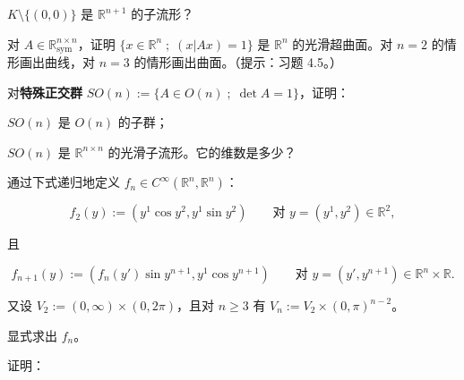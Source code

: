 \begin{exercises}
\begin{items}
\item

$ K \setminus \{(0, 0)\} $
是 $ \mathbb{R}^{n+1} $ 的子流形？

\end{items}

\item

对 $ A \in \mathbb{R}^{n\times n}_{\mathrm{sym}} $，证明 $ \{ x \in \mathbb{R}^{n} \;;\; (x|Ax) = 1 \} $ 是 $ \mathbb{R}^{n} $ 的光滑超曲面。对 $ n = 2 $ 的情形画出曲线，对 $ n = 3 $ 的情形画出曲面。（提示：习题 4.5。）

\item

对\textbf{特殊正交群} $ SO(n) := \{ A \in O(n) \;;\; \det A = 1 \} $，证明：

\begin{items}
\item

$ SO(n) $ 是 $ O(n) $ 的子群；

\item

$ SO(n) $ 是 $ \mathbb{R}^{n\times n} $ 的光滑子流形。它的维数是多少？

\end{items}

\item

通过下式递归地定义 $ f_{n} \in C^{\infty}(\mathbb{R}^{n}, \mathbb{R}^{n}) $：

\[
f_{2}(y) := (y^{1}\cos y^{2}, y^{1}\sin y^{2}) \qquad \text{对 } y = (y^{1}, y^{2}) \in \mathbb{R}^{2} ,
\]

且

\[
f_{n+1}(y) := (f_{n}(y') \sin y^{n+1}, y^{1}\cos y^{n+1}) \qquad \text{对 } y = (y', y^{n+1}) \in \mathbb{R}^{n} \times \mathbb{R} .
\]

又设 $ V_{2} := (0, \infty) \times (0, 2\pi) $，且对 $ n \ge 3 $ 有 $ V_{n} := V_{2} \times (0, \pi)^{n-2} $。

\begin{items}
\item

显式求出 $ f_{n} $。

\item

证明：

\end{items}

\begin{subitems}
\item


\end{subitems}
\end{exercises}
